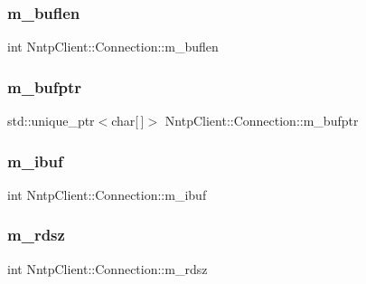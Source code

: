\subsubsection{\texorpdfstring{m\+\_\+buflen}{m\_buflen}}
{\footnotesize\ttfamily int Nntp\+Client\+::\+Connection\+::m\+\_\+buflen\hspace{0.3cm}{\ttfamily [protected]}}

\hypertarget{class_nntp_client_1_1_connection_a4a3885811f0cfe873c8091bc659fb23a}{}\label{class_nntp_client_1_1_connection_a4a3885811f0cfe873c8091bc659fb23a} 
\subsubsection{\texorpdfstring{m\+\_\+bufptr}{m\_bufptr}}
{\footnotesize\ttfamily std\+::unique\+\_\+ptr$<$char\mbox{[}$\,$\mbox{]}$>$ Nntp\+Client\+::\+Connection\+::m\+\_\+bufptr\hspace{0.3cm}{\ttfamily [protected]}}

\hypertarget{class_nntp_client_1_1_connection_a3890026e452ddbd58f184734ddd1f036}{}\label{class_nntp_client_1_1_connection_a3890026e452ddbd58f184734ddd1f036} 
\subsubsection{\texorpdfstring{m\+\_\+ibuf}{m\_ibuf}}
{\footnotesize\ttfamily int Nntp\+Client\+::\+Connection\+::m\+\_\+ibuf\hspace{0.3cm}{\ttfamily [protected]}}

\hypertarget{class_nntp_client_1_1_connection_a04d0a1dc3f7df1d80599002ec7c74b4b}{}\label{class_nntp_client_1_1_connection_a04d0a1dc3f7df1d80599002ec7c74b4b} 
\subsubsection{\texorpdfstring{m\+\_\+rdsz}{m\_rdsz}}
{\footnotesize\ttfamily int Nntp\+Client\+::\+Connection\+::m\+\_\+rdsz\hspace{0.3cm}{\ttfamily [protected]}}

